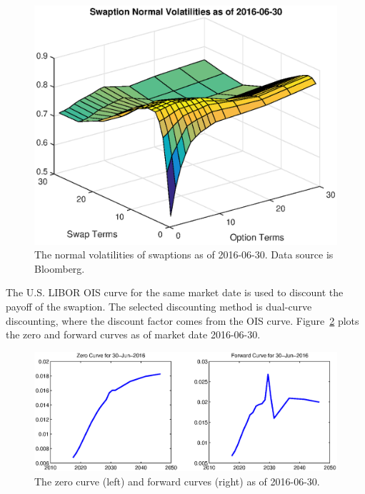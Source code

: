 \begin{center}
\begin{figure}
\centering
  \includegraphics[scale=0.6]{swaption_normal_vol.eps}
  \caption{The normal volatilities of swaptions as of 2016-06-30. Data source is Bloomberg.}\label{fig::swaption_normal_vol}
\end{figure}
\end{center}

The U.S. LIBOR OIS curve for the same market date is used to discount the payoff of the swaption. The selected discounting method is dual-curve discounting, where the discount factor comes from the OIS curve. Figure~\ref{fig::curves} plots the zero and forward curves as of market date 2016-06-30.

\begin{center}
\begin{figure}[htb!]
\centering
  \includegraphics[scale=0.6]{zero_forward_curves.eps}
  \caption{The zero curve (left) and forward curves (right) as of 2016-06-30.}\label{fig::curves}
\end{figure}
\end{center}

